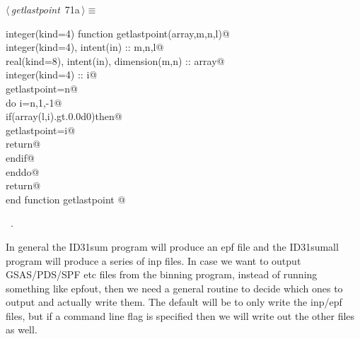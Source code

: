 \documentclass[10pt,a4paper,notitlepage]{article}
\begin{document}
\begin{flushleft} \small
\begin{minipage}{\linewidth}\label{scrap79}\raggedright\small
{} $\langle\,${\it getlastpoint}\nobreak\ {\footnotesize {71a}}$\,\rangle\equiv$
\vspace{-1ex}
\begin{list}{}{} \item
\mbox{}\verb@      integer(kind=4) function getlastpoint(array,m,n,l)@\\
\mbox{}\verb@      integer(kind=4), intent(in) :: m,n,l@\\
\mbox{}\verb@      real(kind=8), intent(in), dimension(m,n) :: array@\\
\mbox{}\verb@      integer(kind=4) :: i@\\
\mbox{}\verb@      getlastpoint=n@\\
\mbox{}\verb@      do i=n,1,-1@\\
\mbox{}\verb@       if(array(l,i).gt.0.0d0)then@\\
\mbox{}\verb@        getlastpoint=i@\\
\mbox{}\verb@        return@\\
\mbox{}\verb@       endif@\\
\mbox{}\verb@      enddo@\\
\mbox{}\verb@      return@\\
\mbox{}\verb@      end function getlastpoint                                              @{\NWsep}
\end{list}
\vspace{-1.5ex}
\footnotesize
\begin{list}{}{\setlength{\itemsep}{-\parsep}\setlength{\itemindent}{-\leftmargin}}
\item \NWtxtMacroRefIn\ .

\item{}
\end{list}
\end{minipage}\vspace{4ex}
\end{flushleft}
In general the ID31sum program will produce an epf file and the ID31sumall
program will produce a series of inp files. 
In case we want to output GSAS/PDS/SPF etc files from the binning program, 
instead of running something like epfout, then we need a general routine
to decide which ones to output and actually write them.
The default will be to only write the inp/epf files, but if a command line
flag is specified then we will write out the other files as well.
\end{document}

